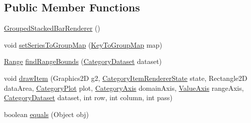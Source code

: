 \subsection*{Public Member Functions}
\begin{DoxyCompactItemize}
\item 
\mbox{\hyperlink{classorg_1_1jfree_1_1chart_1_1renderer_1_1category_1_1_grouped_stacked_bar_renderer_ac1489d9619924ce06825589a80356bb2}{Grouped\+Stacked\+Bar\+Renderer}} ()
\item 
void \mbox{\hyperlink{classorg_1_1jfree_1_1chart_1_1renderer_1_1category_1_1_grouped_stacked_bar_renderer_a9e596a526c83ce0dac6bc64e6e2c0a78}{set\+Series\+To\+Group\+Map}} (\mbox{\hyperlink{classorg_1_1jfree_1_1data_1_1_key_to_group_map}{Key\+To\+Group\+Map}} map)
\item 
\mbox{\hyperlink{classorg_1_1jfree_1_1data_1_1_range}{Range}} \mbox{\hyperlink{classorg_1_1jfree_1_1chart_1_1renderer_1_1category_1_1_grouped_stacked_bar_renderer_a9a3d50c3fc42ee4252cbb00563b3421e}{find\+Range\+Bounds}} (\mbox{\hyperlink{interfaceorg_1_1jfree_1_1data_1_1category_1_1_category_dataset}{Category\+Dataset}} dataset)
\item 
void \mbox{\hyperlink{classorg_1_1jfree_1_1chart_1_1renderer_1_1category_1_1_grouped_stacked_bar_renderer_a1e814c7b938db9f826183c4f8b2b61b5}{draw\+Item}} (Graphics2D g2, \mbox{\hyperlink{classorg_1_1jfree_1_1chart_1_1renderer_1_1category_1_1_category_item_renderer_state}{Category\+Item\+Renderer\+State}} state, Rectangle2D data\+Area, \mbox{\hyperlink{classorg_1_1jfree_1_1chart_1_1plot_1_1_category_plot}{Category\+Plot}} plot, \mbox{\hyperlink{classorg_1_1jfree_1_1chart_1_1axis_1_1_category_axis}{Category\+Axis}} domain\+Axis, \mbox{\hyperlink{classorg_1_1jfree_1_1chart_1_1axis_1_1_value_axis}{Value\+Axis}} range\+Axis, \mbox{\hyperlink{interfaceorg_1_1jfree_1_1data_1_1category_1_1_category_dataset}{Category\+Dataset}} dataset, int row, int column, int pass)
\item 
boolean \mbox{\hyperlink{classorg_1_1jfree_1_1chart_1_1renderer_1_1category_1_1_grouped_stacked_bar_renderer_a0bfc15316e82b0810b8c4e1e4dd523a6}{equals}} (Object obj)
\end{DoxyCompactItemize}
